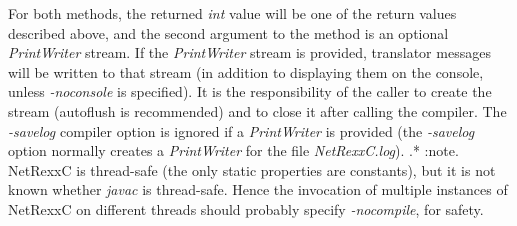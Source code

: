 For both methods, the returned \emph{int} value will be one of the
return values described above, and the second argument to the method is
an optional \emph{PrintWriter} stream.  If the \emph{PrintWriter} stream
is provided, translator messages will be written to that stream (in
addition to displaying them on the console, unless \emph{-noconsole} is
specified).
It is the responsibility of the caller to create the stream (autoflush
is recommended) and to close it after calling the compiler.
The \emph{-savelog} compiler option is ignored if a \emph{PrintWriter}
is provided (the \emph{-savelog} option normally creates
a \emph{PrintWriter} for the file \emph{NetRexxC.log}).
.*
:note.
NetRexxC is thread-safe (the only static properties are constants), but
it is not known whether \emph{javac} is thread-safe.  Hence the
invocation of multiple instances of NetRexxC on different threads should
probably specify \emph{-nocompile}, for safety.
